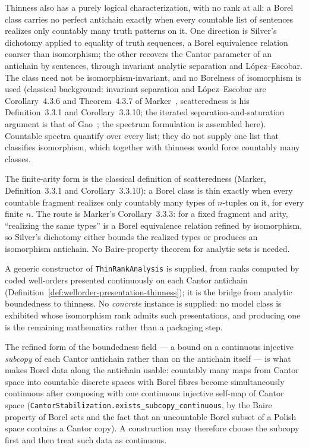 Thinness also has a purely logical characterization, with no rank at all: a
Borel class carries no perfect antichain exactly when every countable list of
sentences realizes only countably many truth patterns on it.  One direction is
Silver's dichotomy applied to equality of truth sequences, a Borel equivalence
relation coarser than isomorphism; the other recovers the Cantor parameter of an
antichain by sentences, through invariant analytic separation and
L\'opez--Escobar.  The class need not be isomorphism-invariant, and no
Borelness of isomorphism is used (classical background: invariant separation and
L\'opez--Escobar are Corollary~4.3.6 and Theorem~4.3.7 of Marker~\cite{marker2016},
scatteredness is his Definition~3.3.1 and Corollary~3.3.10; the iterated
separation-and-saturation argument is that of Gao~\cite[Lemma~5.4.6]{gao2009};
the spectrum formulation is assembled here).  Countable spectra
quantify over every list;
they do not supply one list that classifies isomorphism, which together with
thinness would force countably many classes.


The finite-arity form is the classical definition of scatteredness (Marker,
Definition~3.3.1 and Corollary~3.3.10): a Borel class is thin exactly when every
countable fragment realizes only countably many types of $n$-tuples on it, for
every finite $n$.  The route is Marker's Corollary~3.3.3: for a fixed fragment
and arity, ``realizing the same types'' is a Borel equivalence relation refined
by isomorphism, so Silver's dichotomy either bounds the realized types or
produces an isomorphism antichain.  No Baire-property theorem for analytic sets
is needed.


A generic constructor of \texttt{ThinRankAnalysis} is supplied, from ranks computed
by coded well-orders presented continuously on each Cantor antichain
(Definition~\ref{def:wellorder-presentation-thinness}); it is the bridge from
analytic boundedness to thinness.  No \emph{concrete} instance is supplied: no
model class is exhibited whose isomorphism rank admits such presentations, and
producing one is the remaining mathematics rather than a packaging step.

The refined form of the boundedness field --- a bound on a continuous injective
\emph{subcopy} of each Cantor antichain rather than on the antichain itself ---
is what makes Borel data along the antichain usable: countably many maps from
Cantor space into countable discrete spaces with Borel fibres become
simultaneously continuous after composing with one continuous injective
self-map of Cantor space
(\texttt{CantorStabilization.exists\_subcopy\_continuous}, by the Baire
property of Borel sets and the fact that an uncountable Borel subset of a
Polish space contains a Cantor copy).  A construction may therefore choose the
subcopy first and then treat such data as continuous.

